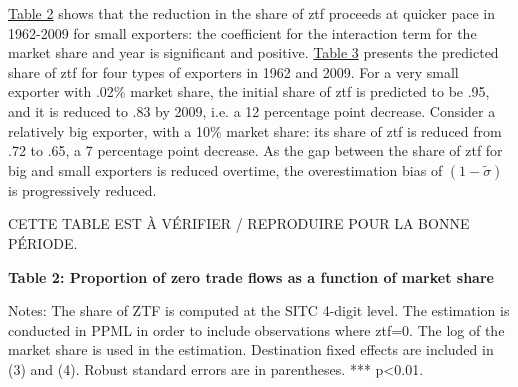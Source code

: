 \documentclass[12pt,twoside,a4paper,notitlepage]{article}
\begin{document}
{{\hyperref[ref-005]{Table 2}} shows that the reduction in the share of ztf proceeds at quicker pace in 1962-2009 for small exporters: the coefficient for the interaction term for the market share and year is significant and positive. {\hyperref[ref-006]{Table 3}} presents the predicted share of ztf for four types of exporters in 1962 and 2009. For a very small exporter with .02\% market share, the initial share of ztf is predicted to be .95, and it is reduced to .83 by 2009, i.e. a 12 percentage point decrease. Consider a relatively big exporter, with a 10\% market share: its share of ztf is reduced from .72 to .65, a 7 percentage point decrease. As the gap between the share of ztf for big and small exporters is reduced overtime, the overestimation bias of $(1-\tilde{\sigma })$ is progressively reduced.

 
CETTE TABLE EST À VÉRIFIER / REPRODUIRE POUR LA BONNE PÉRIODE.


\begin{table}
\textbf{ \label{ref-005}Table 2: Proportion of zero trade flows as a function of market share}


\end{table}

Notes: The share of ZTF is computed at the SITC 4-digit level. The estimation is conducted in PPML in order to include observations where ztf=0. The log of the market share is used in the estimation. Destination fixed effects are included in (3) and (4). Robust standard errors are in parentheses. *** p{\textless}0.01.

}
\end{document}
